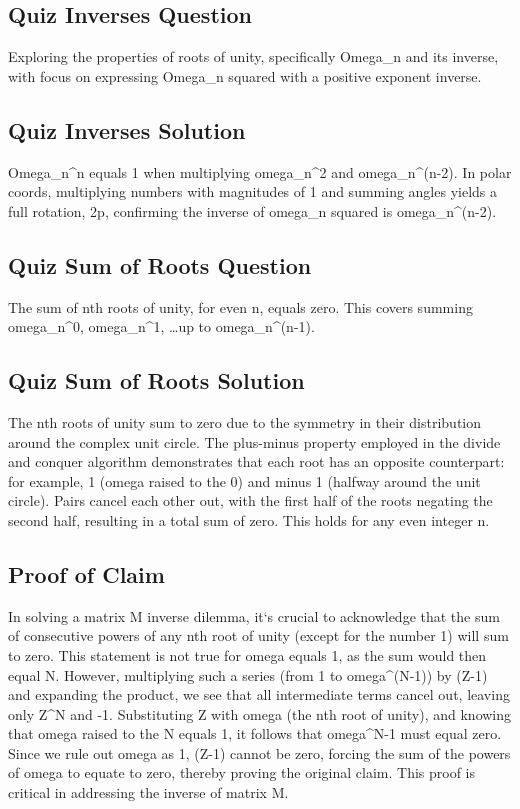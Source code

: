 \subsection*{Quiz  Inverses Question}
Exploring the properties of roots of unity, specifically Omega\_n and its inverse, with focus on expressing Omega\_n squared with a positive exponent inverse.

\subsection*{Quiz  Inverses Solution}
Omega\_n\textasciicircum{}n equals 1 when multiplying omega\_n\textasciicircum{}2 and omega\_n\textasciicircum{}(n-2).
In polar coords, multiplying numbers with magnitudes of 1 and summing angles yields a full rotation, 2p, confirming the inverse of omega\_n squared is omega\_n\textasciicircum{}(n-2).

\subsection*{Quiz  Sum of Roots Question}
The sum of nth roots of unity, for even n, equals zero.
This covers summing omega\_n\textasciicircum{}0, omega\_n\textasciicircum{}1, \ldots up to omega\_n\textasciicircum{}(n-1).

\subsection*{Quiz  Sum of Roots Solution}
The nth roots of unity sum to zero due to the symmetry in their distribution around the complex unit circle.
The plus-minus property employed in the divide and conquer algorithm demonstrates that each root has an opposite counterpart: for example, 1 (omega raised to the 0) and minus 1 (halfway around the unit circle).
Pairs cancel each other out, with the first half of the roots negating the second half, resulting in a total sum of zero.
This holds for any even integer n.

\subsection*{Proof of Claim}
In solving a matrix M inverse dilemma, it`s crucial to acknowledge that the sum of consecutive powers of any nth root of unity (except for the number 1) will sum to zero.
This statement is not true for omega equals 1, as the sum would then equal N\@.
However, multiplying such a series (from 1 to omega\textasciicircum{}(N-1)) by (Z-1) and expanding the product, we see that all intermediate terms cancel out, leaving only Z\textasciicircum{}N and -1.
Substituting Z with omega (the nth root of unity), and knowing that omega raised to the N equals 1, it follows that omega\textasciicircum{}N-1 must equal zero.
Since we rule out omega as 1, (Z-1) cannot be zero, forcing the sum of the powers of omega to equate to zero, thereby proving the original claim.
This proof is critical in addressing the inverse of matrix M\@.


